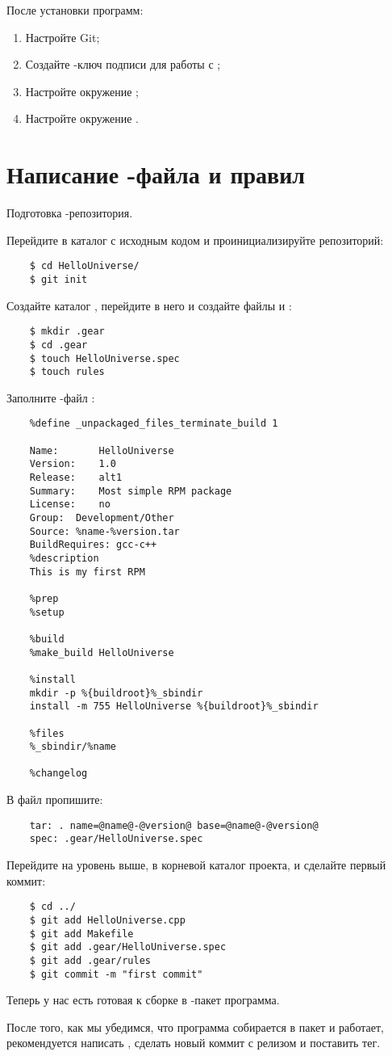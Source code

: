 После установки программ: 
\begin{enumerate}
	\item Настройте Git;
	\item Создайте -ключ подписи для работы с ;
	\item Настройте окружение ;
	\item Настройте окружение .
\end{enumerate}


\section{Написание -файла и правил }
Подготовка -репозитория.

Перейдите в каталог с исходным кодом и проинициализируйте репозиторий: 
\begin{verbatim}
	$ cd HelloUniverse/
	$ git init	
\end{verbatim}

Создайте каталог , перейдите в него и создайте файлы  и :
\begin{verbatim}
	$ mkdir .gear
	$ cd .gear
	$ touch HelloUniverse.spec
	$ touch rules
\end{verbatim} 

Заполните -файл :
\begin{verbatim}
	%define _unpackaged_files_terminate_build 1
	
	Name:       HelloUniverse
	Version:    1.0
	Release:    alt1
	Summary:    Most simple RPM package
	License:    no
	Group:	Development/Other
	Source: %name-%version.tar
	BuildRequires: gcc-c++
	%description
	This is my first RPM
	
	%prep
	%setup
	
	%build
	%make_build HelloUniverse
	
	%install
	mkdir -p %{buildroot}%_sbindir
	install -m 755 HelloUniverse %{buildroot}%_sbindir
	
	%files
	%_sbindir/%name
	
	%changelog
\end{verbatim} 

В файл  пропишите:
\begin{verbatim}
	tar: . name=@name@-@version@ base=@name@-@version@
	spec: .gear/HelloUniverse.spec
\end{verbatim} 

Перейдите на уровень выше, в корневой каталог проекта, и сделайте первый коммит: 
\begin{verbatim}
	$ cd ../ 
	$ git add HelloUniverse.cpp
	$ git add Makefile
	$ git add .gear/HelloUniverse.spec
	$ git add .gear/rules
	$ git commit -m "first commit"
\end{verbatim}

Теперь у нас есть готовая к сборке в -пакет программа. 

После того, как мы убедимся, что программа собирается в пакет и работает, рекомендуется написать , сделать новый коммит с релизом и поставить тег. 